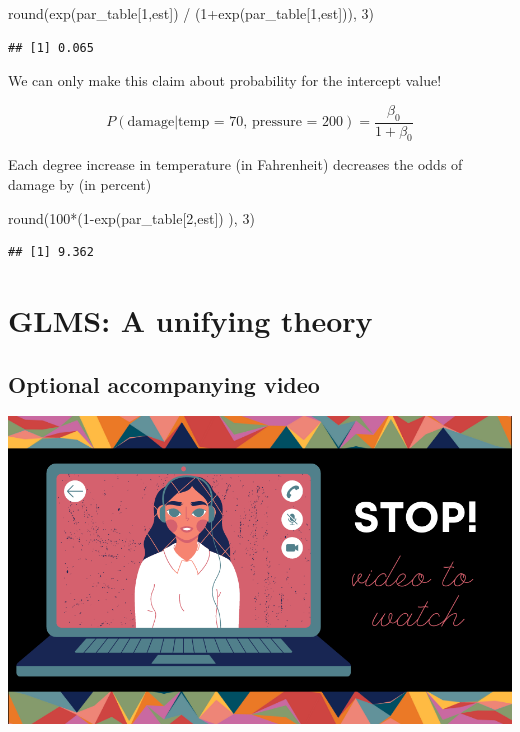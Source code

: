 \documentclass[
  openany]{book}
\newenvironment{Shaded}{\begin{snugshade}}{\end{snugshade}}
\newcommand{\DecValTok}[1]{\textcolor[rgb]{0.00,0.00,0.81}{#1}}
\newcommand{\FunctionTok}[1]{\textcolor[rgb]{0.00,0.00,0.00}{#1}}
\newcommand{\NormalTok}[1]{#1}
\newcommand{\SpecialCharTok}[1]{\textcolor[rgb]{0.00,0.00,0.00}{#1}}
\newcommand{\StringTok}[1]{\textcolor[rgb]{0.31,0.60,0.02}{#1}}
\begin{document}
\begin{Shaded}
\begin{Highlighting}[]
\FunctionTok{round}\NormalTok{(}\FunctionTok{exp}\NormalTok{(par\_table[}\DecValTok{1}\NormalTok{,}\StringTok{\textquotesingle{}est\textquotesingle{}}\NormalTok{]) }\SpecialCharTok{/}\NormalTok{ (}\DecValTok{1}\SpecialCharTok{+}\FunctionTok{exp}\NormalTok{(par\_table[}\DecValTok{1}\NormalTok{,}\StringTok{\textquotesingle{}est\textquotesingle{}}\NormalTok{])), }\DecValTok{3}\NormalTok{)}
\end{Highlighting}
\end{Shaded}

\begin{verbatim}
## [1] 0.065
\end{verbatim}

We can only make this claim about probability for the intercept value!

\[P(\text{damage}|\text{temp = 70, pressure = 200}) = \frac{\beta_0}{1+\beta_0}\]

Each degree increase in temperature (in Fahrenheit) decreases the odds of damage by (in percent)

\begin{Shaded}
\begin{Highlighting}[]
\FunctionTok{round}\NormalTok{(}\DecValTok{100}\SpecialCharTok{*}\NormalTok{(}\DecValTok{1}\SpecialCharTok{{-}}\FunctionTok{exp}\NormalTok{(par\_table[}\DecValTok{2}\NormalTok{,}\StringTok{\textquotesingle{}est\textquotesingle{}}\NormalTok{]) ), }\DecValTok{3}\NormalTok{)}
\end{Highlighting}
\end{Shaded}

\begin{verbatim}
## [1] 9.362
\end{verbatim}

\hypertarget{glms-a-unifying-theory}{%
\section{GLMS: A unifying theory}\label{glms-a-unifying-theory}}

\hypertarget{optional-accompanying-video}{%
\subsection{Optional accompanying video}\label{optional-accompanying-video}}

\begin{center}\includegraphics[width=0.6\linewidth]{images/stop-video} \end{center}
\end{document}
